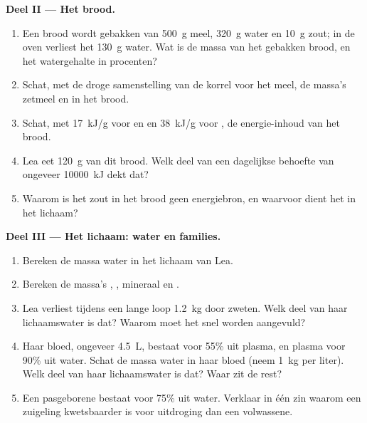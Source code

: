 \begin{problem}
\medskip
\noindent\textbf{Deel II --- Het brood.}
\begin{enumerate}[resume]
  \item Een brood wordt gebakken van \qty{500}{g} meel, \qty{320}{g}
        water en \qty{10}{g} zout; in de oven verliest het \qty{130}{g}
        water. Wat is de massa van het gebakken brood, en het
        watergehalte in procenten?
  \item Schat, met de droge samenstelling van de korrel voor het meel,
        de massa's zetmeel en  in het brood.
  \item Schat, met \qty{17}{kJ/g} voor  en  en
        \qty{38}{kJ/g} voor , de energie-inhoud van het brood.
  \item Lea eet \qty{120}{g} van dit brood. Welk deel van een dagelijkse
        behoefte van ongeveer \qty{10000}{kJ} dekt dat?
  \item Waarom is het zout in het brood geen energiebron, en waarvoor
        dient het in het lichaam?
\end{enumerate}

\medskip
\noindent\textbf{Deel III --- Het lichaam: water en families.}
\begin{enumerate}[resume]
  \item Bereken de massa water in het lichaam van Lea.
  \item Bereken de massa's , , mineraal en .
  \item Lea verliest tijdens een lange loop \qty{1.2}{kg} door zweten.
        Welk deel van haar lichaamswater is dat? Waarom moet het snel
        worden aangevuld?
  \item Haar bloed, ongeveer \qty{4.5}{L}, bestaat voor 55\% uit plasma,
        en plasma voor 90\% uit water. Schat de massa water in haar
        bloed (neem \qty{1}{kg} per liter). Welk deel van haar
        lichaamswater is dat? Waar zit de rest?
  \item Een pasgeborene bestaat voor 75\% uit water. Verklaar in één zin
        waarom een zuigeling kwetsbaarder is voor uitdroging dan een
        volwassene.
\end{enumerate}


\end{problem}
